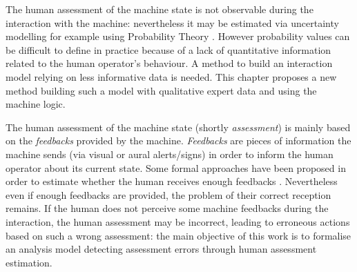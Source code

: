The human assessment of the machine state is not observable 
during the interaction with the machine: nevertheless it
may be estimated via uncertainty modelling for example using
Probability Theory \cite{Oaksford07}. However probability values 
can be difficult to define in practice 
because of a lack of quantitative information related to the human operator's 
behaviour. A method to build an interaction model 
relying on less informative data is needed. 
This chapter proposes a new method building such a model 
with qualitative expert data and using the machine logic.

The human assessment of the machine state (shortly {\em assessment}) is mainly 
based on the {\em feedbacks} provided by the machine. {\em Feedbacks} are pieces 
of information the machine sends (via visual or aural alerts/signs) in order 
to inform the human operator about its current state. Some formal approaches 
have been proposed in order to estimate whether the human receives enough 
feedbacks \cite{Ozveren90,combefis11}. Nevertheless even if enough feedbacks 
are provided, the problem of their correct reception remains. If the human does 
not perceive some machine feedbacks during the interaction, the human assessment may 
be incorrect, leading to erroneous actions based on such a wrong assessment: 
the main objective of this work is to formalise an analysis model detecting 
assessment errors through human assessment estimation.\\


